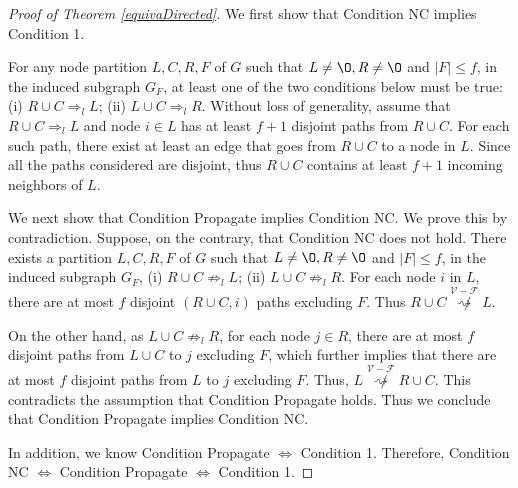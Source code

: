 \documentclass[letterpaper, 11pt]{article}
\newcommand{\calF}{{\mathcal{F}}}
\newcommand{\calV}{{\mathcal{V}}}
\begin{document}
\begin{proof}[Proof of Theorem \ref{equivaDirected}]
We first show that Condition NC implies Condition 1.

For any node partition $L, C, R, F$ of $G$ such that $L\not=\O, R\not=\O$ and $|F|\le f$, in the induced subgraph $G_F$,
at least one of the two conditions below must be true: (i) $R\cup C\Rightarrow_l L$; (ii) $L\cup C\Rightarrow_l R$. Without loss of generality, assume that $R\cup C\Rightarrow_l L$ and node $i\in L$ has at least $f+1$ disjoint paths from $R\cup C$. For each such path, there exist at least an edge that goes from $R\cup C$ to a node in $L$. Since all the paths considered are disjoint, thus $R\cup C$ contains at least $f+1$ incoming neighbors of $L$.


We next show that Condition Propagate implies Condition NC. We prove this by contradiction. Suppose, on the contrary, that Condition NC does not hold. There exists a partition $L, C, R, F$ of $G$ such that $L\not=\O, R\not=\O$ and $|F|\le f$, in the induced subgraph $G_F$,
 (i) $R\cup C\not\Rightarrow_l L$; (ii) $L\cup C\not\Rightarrow_l R$. For each node $i$ in $L$, there are at most $f$ disjoint $(R\cup C, i)$ paths excluding $F$. Thus $R\cup C \overset{\calV-\calF}{\not\rightsquigarrow}L$.

On the other hand, as $L\cup C\not\Rightarrow_l R$, for each node $j\in R$, there are at most $f$ disjoint paths from $L\cup C$ to $j$ excluding $F$, which further implies that there are at most $f$ disjoint paths from $L$ to $j$ excluding $F$.
Thus, $L \overset{\calV-\calF}{\not\rightsquigarrow}R\cup C$. This contradicts the assumption that Condition Propagate holds. Thus we conclude that Condition Propagate implies Condition NC.

In addition, we know Condition Propagate $\iff$ Condition 1. Therefore, Condition NC $\iff$ Condition Propagate $\iff$ Condition 1.
\end{proof}
\end{document}
